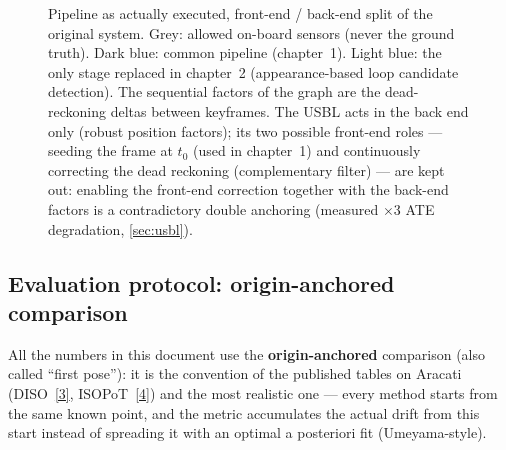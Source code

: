 \begin{figure}[H]
\caption{Pipeline as actually executed, front-end / back-end split of the original
system. Grey: allowed on-board sensors (never the ground truth). Dark blue: common
pipeline (chapter~1). Light blue: the only stage replaced in chapter~2
(appearance-based loop candidate detection). The sequential factors of the graph
are the dead-reckoning deltas between keyframes. The USBL acts in the back end
only (robust position factors); its two possible front-end roles — seeding the
frame at $t_0$ (used in chapter~1) and continuously correcting the dead reckoning
(complementary filter) — are kept out: enabling the front-end correction together
with the back-end factors is a contradictory double anchoring (measured $\times$3
ATE degradation, \autoref{sec:usbl}).}
\label{fig:pipeline}
\end{figure}

\subsection{Evaluation protocol: origin-anchored comparison}
\label{sec:protocole}

All the numbers in this document use the \textbf{origin-anchored} comparison (also
called ``first pose''): it is the convention of the published tables on Aracati
(DISO~\hyperref[bib:diso]{[3]}, ISOPoT~\hyperref[bib:isopot]{[4]}) and the most realistic one — every method starts
from the same known point, and the metric accumulates the actual drift from this
start instead of spreading it with an optimal a posteriori fit (Umeyama-style).

